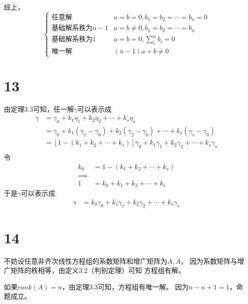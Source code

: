\documentclass{article}
\begin{document}
综上，
\begin{equation*}
  \begin{cases}
    \text{任意解}           & a = b = 0, b_1 = b_2 =\cdots = b_n = 0 \\
    \text{基础解系秩为$n - 1$} & a = b \neq 0, b_1 = b_2 =\cdots = b_n  \\
    \text{基础解系秩为$1$}     & a = b = 0, \sum\limits_{i}^n b_i = 0   \\
    \text{唯一解}           & (n - 1)a + b \neq 0
  \end{cases}
\end{equation*}

\section*{13}
由定理3.3可知，任一解$\gamma$可以表示成
\begin{align*}
  \gamma & = \gamma_0 + k_1\eta_1 + k_2\eta_2 + \cdots + k_s\eta_s                                              \\
         & = \gamma_0 + k_1(\gamma_1 - \gamma_0) + k_2(\gamma_2 - \gamma_0) + \cdots + k_s(\gamma_s - \gamma_0) \\
         & = [1 - (k_1 + k_2 + \cdots + k_s)] \gamma_0 + k_1 \gamma_1 + k_2 \gamma_2 + \cdots + k_s \gamma_s    \\
\end{align*}
令
\begin{align*}
  k_0 & = 1 - (k_1 + k_2 + \cdots + k_s) \\
  \implies                               \\
  1   & = k_0 + k_1 + k_2 + \cdots + k_s
\end{align*}
于是$\gamma$可以表示成
\begin{align*}
  \gamma & = k_0 \gamma_0 + k_1 \gamma_1 + k_2 \gamma_2 + \cdots + k_s \gamma_s
\end{align*}


\section*{14}

不妨设任意非齐次线性方程组的系数矩阵和增广矩阵为$A, \overline{A}$，
因为系数矩阵与增广矩阵的秩相等，由定义3.2（判别定理）可知
方程组有解。

如果$rank(A) = n$，由定理3.3可知，方程组有唯一解。
因为$n - n + 1 = 1$，命题成立。
\end{document}
